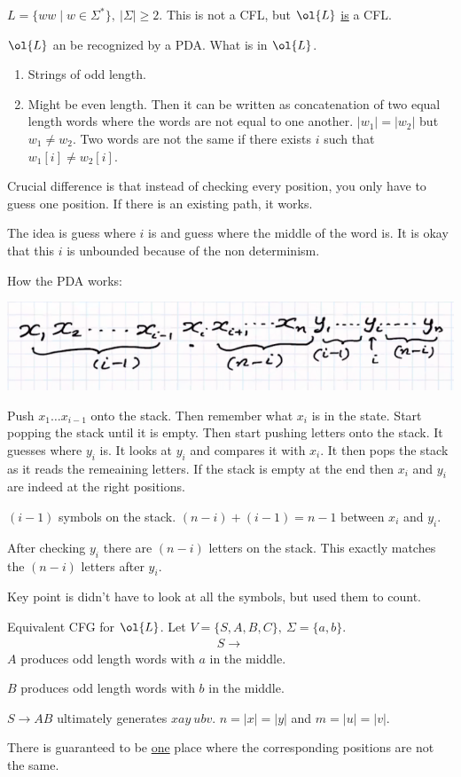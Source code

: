 \documentclass[../598comp.tex]{subfiles}
\begin{document}
\begin{example}
  $L = \{ww \mid w \in \Sigma^*\}, \ |\Sigma| \geq 2$. This is not a CFL, but
  $\ol{L}$ \ul{is} a CFL.

  $\ol{L}$ an be recognized by a PDA. What is in $\ol{L}$.
  \begin{enumerate}
  \item 
    Strings of odd length.
  \item
    Might be even length. Then it can be written as concatenation of two equal
    length words where the words are not equal to one another. $|w_1| = |w_2|$
    but $w_1 \neq w_2$. Two words are not the same if there exists $i$ such that
    $w_1[i] \neq w_2[i]$.
  \end{enumerate}
  Crucial difference is that instead of checking every position, you only have
  to guess one position. If there is an existing path, it works.

  The idea is guess where $i$ is and guess where the middle of the word is. It
  is okay that this $i$ is unbounded because of the non determinism.

  How the PDA works:

  \includegraphics[width=\textwidth]{pda_word_example6.png}

  Push $x_1 \dots x_{i - 1}$ onto the stack. Then remember what $x_i$ is in the
  state. Start popping the stack until it is empty. Then start pushing letters
  onto the stack. It guesses where $y_i$ is. It looks at $y_i$ and compares it
  with $x_i$. It then pops the stack as it reads the remeaining letters. If the
  stack is empty at the end then $x_i$ and $y_i$ are indeed at the right positions.

  $(i - 1)$ symbols on the stack. $(n - i) + (i - 1) = n - 1$ between $x_i$ and $y_i$.

  After checking $y_i$ there are $(n - i)$ letters on the stack. This exactly
  matches the $(n - i)$ letters after $y_i$.

  Key point is didn't have to look at all the symbols, but used them to count.
\end{example}

\begin{example}
  Equivalent CFG for $\ol{L}$. Let $V = \{S, A, B, C\}, \ \Sigma = \{a, b\}$.
  \begin{gather*}
    S \to 
  \end{gather*}
  $A$ produces odd length words with $a$ in the middle.

  $B$ produces odd length words with $b$ in the middle.

  $S \to AB$ ultimately generates $xay \ ubv$. $n = |x| = |y|$ and $m = |u| = |v|$.

  There is guaranteed to be \ul{one} place where the corresponding positions are
  not the same.
\end{example}
\end{document}
